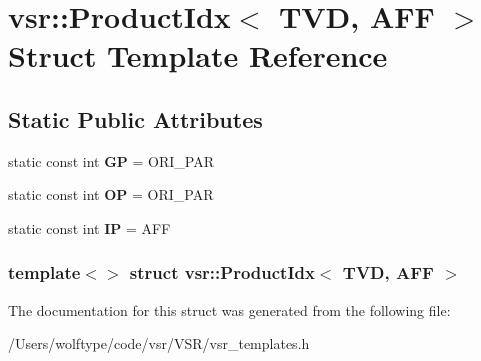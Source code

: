 \hypertarget{structvsr_1_1_product_idx_3_01_t_v_d_00_01_a_f_f_01_4}{\section{vsr\-:\-:Product\-Idx$<$ T\-V\-D, A\-F\-F $>$ Struct Template Reference}
\label{structvsr_1_1_product_idx_3_01_t_v_d_00_01_a_f_f_01_4}
}
\subsection*{Static Public Attributes}
\begin{DoxyCompactItemize}
\item 
\hypertarget{structvsr_1_1_product_idx_3_01_t_v_d_00_01_a_f_f_01_4_a185504624f0bfc002d1c486902b32f9e}{static const int {\bfseries G\-P} = O\-R\-I\-\_\-\-P\-A\-R}\label{structvsr_1_1_product_idx_3_01_t_v_d_00_01_a_f_f_01_4_a185504624f0bfc002d1c486902b32f9e}

\item 
\hypertarget{structvsr_1_1_product_idx_3_01_t_v_d_00_01_a_f_f_01_4_ad10670252753c7d15b13778bd382f15f}{static const int {\bfseries O\-P} = O\-R\-I\-\_\-\-P\-A\-R}\label{structvsr_1_1_product_idx_3_01_t_v_d_00_01_a_f_f_01_4_ad10670252753c7d15b13778bd382f15f}

\item 
\hypertarget{structvsr_1_1_product_idx_3_01_t_v_d_00_01_a_f_f_01_4_a4dc8c2ea9f67bc022b45c1262116fc8d}{static const int {\bfseries I\-P} = A\-F\-F}\label{structvsr_1_1_product_idx_3_01_t_v_d_00_01_a_f_f_01_4_a4dc8c2ea9f67bc022b45c1262116fc8d}

\end{DoxyCompactItemize}
\subsubsection*{template$<$$>$ struct vsr\-::\-Product\-Idx$<$ T\-V\-D, A\-F\-F $>$}



The documentation for this struct was generated from the following file\-:\begin{DoxyCompactItemize}
\item 
/\-Users/wolftype/code/vsr/\-V\-S\-R/vsr\-\_\-templates.\-h\end{DoxyCompactItemize}
